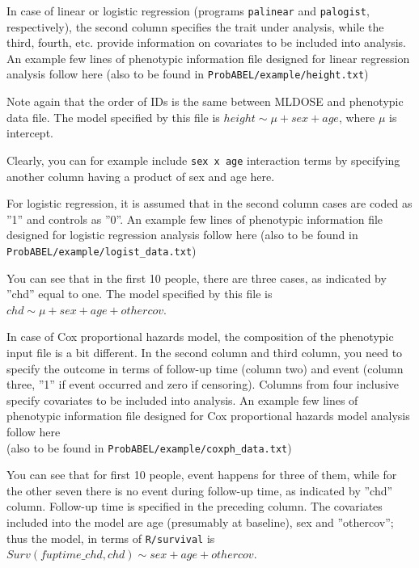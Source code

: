 \documentclass[12pt]{article}
\begin{document}
In case of linear or logistic regression (programs \texttt{palinear} and 
\texttt{palogist}, respectively), the second column specifies the trait 
under analysis, while the third, fourth, etc. 
provide information on covariates to be included into analysis. 
An example few lines of phenotypic information file designed for 
linear regression analysis follow here (also 
to be found in \texttt{ProbABEL/example/height.txt})



Note again that the order of IDs is the same between MLDOSE and phenotypic 
data file. The model specified by this file is $height \sim \mu + sex + age$, 
where $\mu$ is intercept.  

Clearly, you can for example include \texttt{sex x age} interaction terms by 
specifying another column having a product of sex and age here.

For logistic regression, it is assumed that in the second column cases are 
coded as ''1'' and controls as ''0''. An example few lines of phenotypic 
information file designed for logistic regression analysis follow here (also 
to be found in \texttt{ProbABEL/example/logist\_data.txt})



You can see that in the first 10 people, there are three cases, as indicated 
by ''chd'' equal to one. The model specified by this file 
is $chd \sim \mu + sex + age + othercov$.  

In case of Cox proportional hazards model, the composition of the 
phenotypic input file is a bit different. In the second column and 
third column, you need to specify the outcome in terms of follow-up 
time (column two) and event (column three, ''1'' if event occurred 
and zero if censoring). Columns from four inclusive specify covariates 
to be included into analysis. An example few lines of phenotypic 
information file designed for Cox proportional hazards model 
analysis follow here \\(also to be found in
\texttt{ProbABEL/example/coxph\_data.txt})



You can see that for first 10 people, event happens for three of 
them, while for the other seven there is no event during follow-up 
time, as indicated 
by ''chd'' column. Follow-up time is specified in the preceding 
column. The covariates included into the model are age (presumably 
at baseline), sex and ''othercov''; thus the model, in terms of 
\texttt{R/survival} is \\ $Surv(fuptime\_chd, chd) \sim sex + age + othercov$.  
\end{document}
